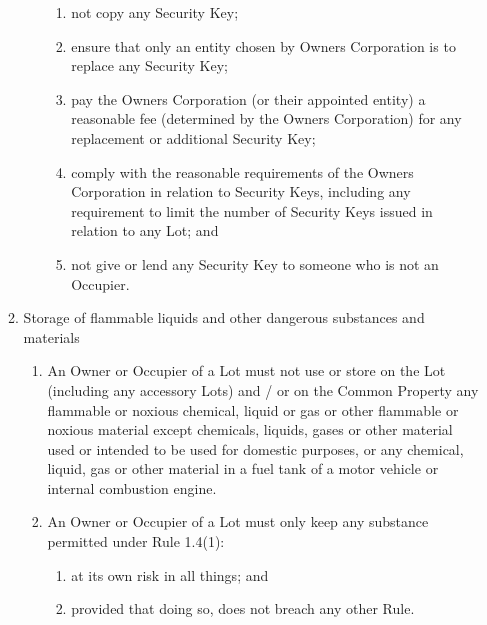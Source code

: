 \documentclass{article}
\begin{document}
\begin{enumerate}[label=\arabic*.]
\begin{enumerate}[label=\arabic{enumi}.\arabic*.]
\begin{enumerate}[label=(\arabic*)]
\begin{enumerate}[label=(\alph*)]
\item  not copy any Security Key;

\item  ensure that only an entity chosen by Owners Corporation is to replace any Security Key;

\item  pay the Owners Corporation (or their appointed entity) a reasonable fee (determined by the Owners Corporation) for any replacement or additional Security Key;

\item  comply with the reasonable requirements of the Owners Corporation in relation to Security Keys, including any requirement to limit the number of Security Keys issued in relation to any Lot; and

\item  not give or lend any Security Key to someone who is not an Occupier.
\newpage



\end{enumerate}

\end{enumerate}

\item  Storage of flammable liquids and other dangerous substances and materials

\begin{enumerate}[label=(\arabic*)]

\item  An Owner or Occupier of a Lot must not use or store on the Lot (including any accessory Lots) and / or on the Common Property any flammable or noxious chemical, liquid or gas or other flammable or noxious material except chemicals, liquids, gases or other material used or intended to be used for domestic purposes, or any chemical, liquid, gas or other material in a fuel tank of a motor vehicle or internal combustion engine.

\item  An Owner or Occupier of a Lot must only keep any substance permitted under Rule 1.4(1):

\begin{enumerate}[label=(\alph*)]

\item  at its own risk in all things; and

\item  provided that doing so, does not breach any other Rule.

\end{enumerate}


\end{enumerate}
\end{enumerate}
\end{enumerate}
\end{document}
